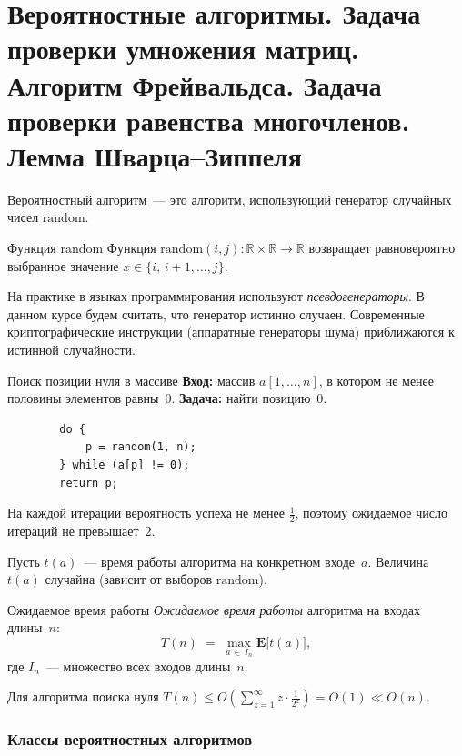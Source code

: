 
\section{Вероятностные алгоритмы. Задача проверки умножения матриц. Алгоритм Фрейвальдса. Задача проверки равенства многочленов. Лемма Шварца--Зиппеля}

Вероятностный алгоритм~--- это алгоритм, использующий генератор случайных чисел $\mathrm{random}$.

\begin{Definition}{Функция random}{}
	Функция $\mathrm{random}(i,j)\colon \mathbb{R}\times\mathbb{R}\to\mathbb{R}$ возвращает равновероятно выбранное значение $x\in\{i,\,i{+}1,\ldots,j\}$.
\end{Definition}

\begin{Remark}{}{}
	На практике в языках программирования используют \emph{псевдогенераторы}. В данном курсе будем считать, что генератор истинно случаен. Современные криптографические инструкции (аппаратные генераторы шума) приближаются к истинной случайности.
\end{Remark}

\begin{Example}{Поиск позиции нуля в массиве}{}
	\textbf{Вход:} массив $a[1,\ldots,n]$, в котором не менее половины элементов равны~$0$. \textbf{Задача:} найти позицию~$0$.
	\begin{verbatim}
		do {
			p = random(1, n);
		} while (a[p] != 0);
		return p;
	\end{verbatim}
	На каждой итерации вероятность успеха не менее $\tfrac{1}{2}$, поэтому ожидаемое число итераций не превышает~$2$.
\end{Example}

Пусть $t(a)$~--- время работы алгоритма на конкретном входе~$a$. Величина $t(a)$ случайна (зависит от выборов $\mathrm{random}$).

\begin{Definition}{Ожидаемое время работы}{}
	\emph{Ожидаемое время работы} алгоритма на входах длины~$n$:
	\[
	T(n) \;=\; \max_{a\,\in\, I_n} \mathbf{E}\bigl[t(a)\bigr],
	\]
	где $I_n$~--- множество всех входов длины~$n$.
\end{Definition}

Для алгоритма поиска нуля $T(n) \le O\!\left(\sum_{z=1}^{\infty} z\cdot\tfrac{1}{2^z}\right) = O(1) \ll O(n)$.

\subsubsection*{Классы вероятностных алгоритмов}

